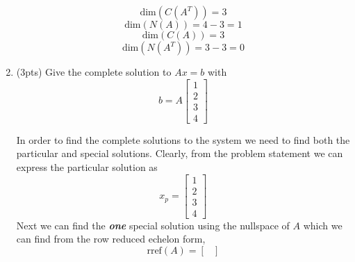 \begin{enumerate}[label=(\alph*)]
\begin{mdframed}[style=MyFrame]
            \begin{equation}
                \text{dim}(C(A^{T})) = 3
            \end{equation}
            \begin{equation}
                \text{dim}(N(A)) = 4-3 = 1
            \end{equation}
            \begin{equation}
                \text{dim}(C(A)) = 3
            \end{equation}
            \begin{equation}
                \text{dim}(N(A^{T})) = 3-3 = 0
            \end{equation}
        \end{mdframed}

    \item (3pts) Give the complete solution to $Ax=b$ with
        \begin{equation}
            b = 
            A 
            \begin{bmatrix}
                1   \\
                2   \\
                3   \\
                4
            \end{bmatrix}
        \end{equation}
        \begin{mdframed}[style=MyFrame]
            In order to find the complete solutions to the system we need
            to find both the particular and special solutions. Clearly,
            from the problem statement we can express the particular
            solution as
            \begin{equation}
                x_{p} =
                \begin{bmatrix}
                    1       \\
                    2       \\
                    3       \\
                    4
                \end{bmatrix}
            \end{equation}
            Next we can find the \emph{\textbf{one}} special solution using
            the nullspace of $A$ which we can find from the row reduced
            echelon form, 
            \begin{equation}
                \text{rref}(A) =
                \begin{bmatrix}

\end{bmatrix}
\end{equation}
\end{mdframed}
\end{enumerate}
